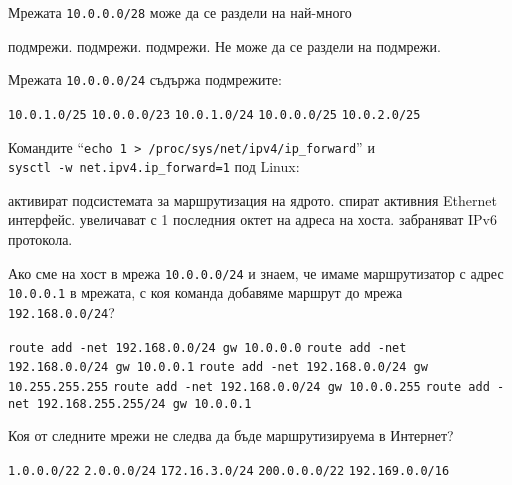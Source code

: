 \begin{questions}
  \question[6] Мрежата \texttt{10.0.0.0/28} може да се раздели на най-много
  \begin{choices}
     подмрежи.
     подмрежи.
     подмрежи.
    \choice Не може да се раздели на подмрежи.
  \end{choices}

  \question[6] Мрежата \texttt{10.0.0.0/24} съдържа подмрежите:
  \begin{choices}
    \choice \texttt{10.0.1.0/25}
    \choice \texttt{10.0.0.0/23}
    \choice \texttt{10.0.1.0/24}
    \CorrectChoice \texttt{10.0.0.0/25}
    \choice \texttt{10.0.2.0/25}
  \end{choices}

  \question[6] Командите "`\texttt{echo 1 > /proc/sys/net/ipv4/ip\_forward}"' и \\
  \texttt{sysctl -w net.ipv4.ip\_forward=1} под Linux:
  \begin{choices}
    \CorrectChoice активират подсистемата за маршрутизация на ядрото.
    \choice спират активния Ethernet интерфейс.
    \choice увеличават с 1 последния октет на адреса на хоста.
    \choice забраняват IPv6 протокола.
  \end{choices}

  \question[6] Ако сме на хост в мрежа \texttt{10.0.0.0/24} и знаем, че имаме
  маршрутизатор с адрес \texttt{10.0.0.1} в мрежата, с коя команда добавяме
  маршрут до мрежа \texttt{192.168.0.0/24}?
  \begin{choices}
    \choice \texttt{route add -net 192.168.0.0/24 gw 10.0.0.0}
    \CorrectChoice \texttt{route add -net 192.168.0.0/24 gw 10.0.0.1}
    \choice \texttt{route add -net 192.168.0.0/24 gw 10.255.255.255}
    \choice \texttt{route add -net 192.168.0.0/24 gw 10.0.0.255}
    \choice \texttt{route add -net 192.168.255.255/24 gw 10.0.0.1}
  \end{choices}

  \question[6] Коя от следните мрежи не следва да бъде маршрутизируема в Интернет?
  \begin{choices}
    \choice \texttt{1.0.0.0/22}
    \choice \texttt{2.0.0.0/24}
    \CorrectChoice \texttt{172.16.3.0/24}
    \choice \texttt{200.0.0.0/22}
    \choice \texttt{192.169.0.0/16}
  \end{choices}
\end{questions}

